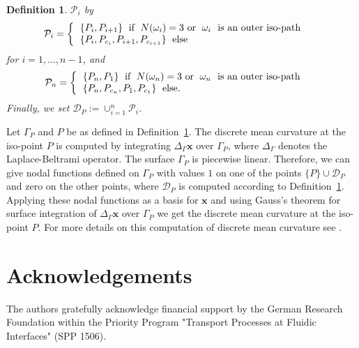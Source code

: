 \documentclass[a4paper,11pt]{article}
\newtheorem{definition}[theorem]{Definition}
\begin{document}
\begin{definition}
$\mathcal{P}_i$ by
\begin{equation*}
\mathcal{P}_i=\left\{\begin{tabular}{ll}
$\{P_i,P_{i+1}\}$\;\mbox{ if }\;$N(\omega_i)=3$\mbox{ or }\;$\omega_i$ \mbox{ is an outer iso-path}&\mbox{}\\
$\{P_i,P_{c_i},P_{i+1},P_{c_{i+1}}\}$\;\mbox{ else}&\mbox{}
\end{tabular}\right.
\end{equation*}
for $i=1,\ldots,n-1$, and
\begin{equation*}
\mathcal{P}_n=\left\{\begin{tabular}{ll}
$\{P_n,P_1\}$\;\mbox{ if }\;$N(\omega_n)=3$\mbox{ or }\;$\omega_n$ \mbox{ is an outer iso-path}&\mbox{}\\
$\{P_n,P_{c_n},P_1,P_{c_1}\}$\;\mbox{ else}.&\mbox{}
\end{tabular}\right.
\end{equation*}
Finally, we set $\mathcal{D}_P:=\cup_{i=1}^n\mathcal{P}_i$.
\label{def:neighboring-points-1}
\end{definition}

Let $\Gamma_P$ and $P$ be as defined in
Definition~\ref{def:neighboring-points-1}. The discrete mean curvature at the iso-point $P$ is computed by
integrating $\Delta_{\Gamma}\pmb{x}$ over $\Gamma_P$, where $\Delta_{\Gamma}$ denotes the
Laplace-Beltrami operator. The surface $\Gamma_P$ is piecewise linear. Therefore, we can give
nodal functions defined on $\Gamma_P$ with values $1$ on one of the points $\{P\}\cup \mathcal{D}_P$
and zero on the other points, where $\mathcal{D}_P$ is computed according to
Definition~\ref{def:neighboring-points-1}. Applying these nodal functions as a basis for $\pmb{x}$
and using Gauss's theorem for surface integration of $\Delta_{\Gamma}\pmb{x}$ over $\Gamma_P$ we get
the discrete mean curvature at the iso-point $P$. For more details on this computation of discrete mean curvature
see \cite{Meyer02Vismath}.




\section*{Acknowledgements}
The authors gratefully acknowledge financial support by the German Research Foundation within the
Priority Program "Transport Processes at Fluidic Interfaces" (SPP 1506).
\newpage


\end{document}
